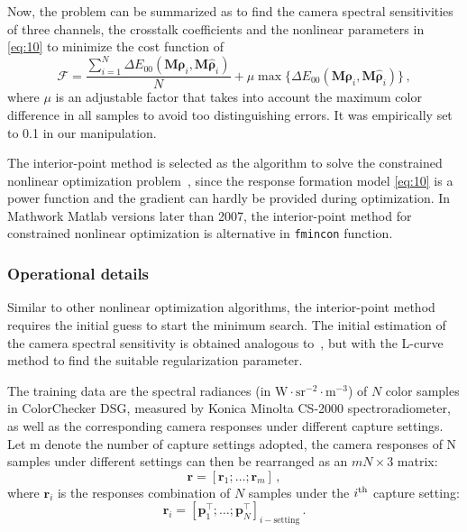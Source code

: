 \documentclass[9pt,twocolumn,twoside]{osajnl}
\providecommand{\DIFaddbegin}{} %
\providecommand{\DIFaddend}{} %
\providecommand{\DIFdelbegin}{} %
\providecommand{\DIFdelend}{} %
\begin{document}
Now, the problem can be summarized as to find the camera spectral sensitivities of three channels, the crosstalk coefficients and the nonlinear parameters in \eqref{eq:10} to minimize the cost function of
\begin{equation}
\mathcal{F} = \frac{\sum\limits_{i = 1}^N\Delta{}E_{00}\left(\mathbf{M}\boldsymbol{\rho}_i, \mathbf{M}\hat{\boldsymbol{\rho}}_i\right)}{N} + \mu\max\big\{\Delta{}E_{00}\left(\mathbf{M}\boldsymbol{\rho}_i, \mathbf{M}\hat{\boldsymbol{\rho}}_i\right)\big\}\,,
\label{eq:12}
\end{equation}
where $\mu$ is an adjustable factor that takes into account the maximum color difference in all samples to avoid too distinguishing errors. It was empirically set to 0.1 in our manipulation.

The interior-point method is selected as the algorithm to solve the constrained nonlinear optimization problem~\cite{Byrd:99,Forsgren:02}, since the response formation model \eqref{eq:10} is a power function and the gradient can hardly be provided during optimization. In Mathwork Matlab versions later than 2007, the interior-point method for constrained nonlinear optimization is alternative in \verb|fmincon| function.

\subsubsection{Operational details}\DIFdelbegin %
\DIFdelend \DIFaddbegin \label{sec:operational details}
\DIFaddend 

Similar to other nonlinear optimization algorithms, the interior-point method requires the initial guess to start the minimum search. The initial estimation of the camera spectral sensitivity is obtained analogous to~\cite{Barnard:02}, but with the L-curve method to find the suitable regularization parameter.

The training data are the spectral radiances (in $\text{W}\cdot\text{sr}^{-2}\cdot\text{m}^{-3}$) of $N$ color samples in ColorChecker DSG, measured by Konica Minolta CS-2000 spectroradiometer, as well as the corresponding camera responses under different capture settings. Let m denote the number of capture settings adopted, the camera responses of N samples under different settings can then be rearranged as an $mN\times3$ matrix:
\begin{equation}
\mathbf{r} = \left[\mathbf{r}_1;\ldots;\mathbf{r}_m\right]\,,
\label{eq:13}
\end{equation}
where $\mathbf{r}_i$ is the responses combination of $N$ samples under the $i\textsuperscript{th}$ capture setting:
\begin{equation}
\mathbf{r}_i = \left[\mathbf{p}_1^\intercal;\ldots;\mathbf{p}_N^\intercal\right]_{i-\text{setting}}\,.
\label{eq:14}
\end{equation}
\end{document}
